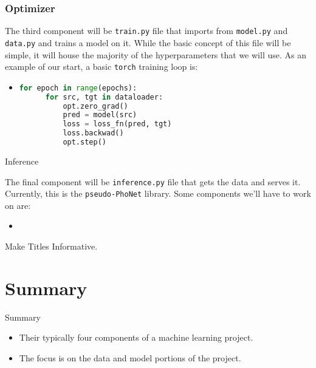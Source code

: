 \documentclass{beamer}
\begin{document}
\begin{frame}[fragile]
\frametitle{Optimizer}

  The third component will be \texttt{train.py} file that imports from \texttt{model.py}
  and \texttt{data.py} and trains a model on it.
  While the basic concept of this file will be simple, it will house the majority of the
  hyperparameters that we will use.
  As an example of our start, a basic \texttt{torch} training loop is:
  \begin{itemize}
  \item 
  \begin{lstlisting}[language=Python]
  for epoch in range(epochs):
      for src, tgt in dataloader:
          opt.zero_grad()
          pred = model(src)
          loss = loss_fn(pred, tgt)
          loss.backwad()
          opt.step()
  \end{lstlisting}
  \end{itemize}
\end{frame}

\begin{frame}{Inference}

  The final component will be \texttt{inference.py} file that gets the data and serves it.
  Currently, this is the \texttt{pseudo-PhoNet} library.
  Some components we'll have to work on are:
  \begin{itemize}
  \item 
  \end{itemize}
\end{frame}

\begin{frame}{Make Titles Informative.}
\end{frame}

\section*{Summary}

\begin{frame}{Summary}

  \begin{itemize}
  \item
    Their \alert{typically four components} of a machine learning project.
  \item
    The focus is on the \alert{data and model} portions of the project.
  \end{itemize}
  
\end{frame}
\end{document}
